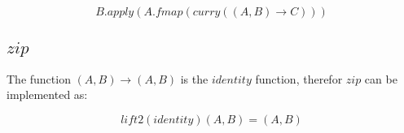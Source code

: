 \documentclass{shpdocumentation}
\begin{document}
\[ \boxed{B}.apply(\boxed{A}.fmap(curry((A, B) \to C))) \]

\subsection{$zip$} \label{solution-zip}

The function $(A, B) \to (A, B)$ is the $identity$ function, therefor $zip$ can be implemented as:

\[ lift2(identity)(\boxed{A}, \boxed{B}) = \boxed{(A, B)} \]

%
%
\end{document}

